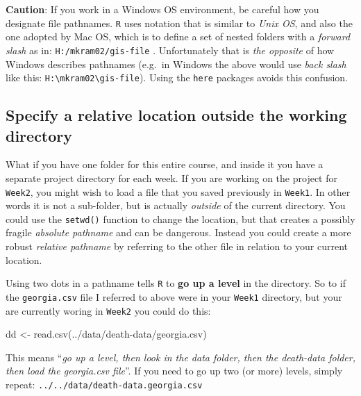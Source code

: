 \documentclass[
]{book}
\newenvironment{Shaded}{\begin{snugshade}}{\end{snugshade}}
\newcommand{\FunctionTok}[1]{\textcolor[rgb]{0.00,0.00,0.00}{#1}}
\newcommand{\NormalTok}[1]{#1}
\newcommand{\OtherTok}[1]{\textcolor[rgb]{0.56,0.35,0.01}{#1}}
\newcommand{\StringTok}[1]{\textcolor[rgb]{0.31,0.60,0.02}{#1}}
\newenvironment{rmdcaution}[1]
  {
  \begin{itemize}
  \renewcommand{\labelitemi}{
    \raisebox{-.7\height}[0pt][0pt]{
      {\setkeys{Gin}{width=3em,keepaspectratio}\texttt{[image: images/\#1]}}
    }
  }
  \setlength{\fboxsep}{1em}
  \begin{caution}
  \item
  }
  {
  \end{caution}
  \end{itemize}
  }
\begin{document}
\begin{rmdcaution}{caution}
\textbf{Caution}: If you work in a Windows OS environment, be careful how you designate file pathnames. \texttt{R} uses notation that is similar to \emph{Unix OS}, and also the one adopted by Mac OS, which is to define a set of nested folders with a \emph{forward slash} as in: \texttt{H:/mkram02/gis-file} . Unfortunately that is \emph{the opposite} of how Windows describes pathnames (e.g.~in Windows the above would use \emph{back slash} like this: \texttt{H:\textbackslash{}mkram02\textbackslash{}gis-file}). Using the \texttt{here} packages avoids this confusion.

\end{rmdcaution}

\hypertarget{specify-a-relative-location-outside-the-working-directory}{%
\subsection{Specify a relative location outside the working directory}\label{specify-a-relative-location-outside-the-working-directory}}

What if you have one folder for this entire course, and inside it you have a separate project directory for each week. If you are working on the project for \texttt{Week2}, you might wish to load a file that you saved previously in \texttt{Week1}. In other words it is not a sub-folder, but is actually \emph{outside} of the current directory. You could use the \texttt{setwd()} function to change the location, but that creates a possibly fragile \emph{absolute pathname} and can be dangerous. Instead you could create a more robust \emph{relative pathname} by referring to the other file in relation to your current location.

Using two dots in a pathname tells \texttt{R} to \textbf{go up a level} in the directory. So to if the \texttt{georgia.csv} file I referred to above were in your \texttt{Week1} directory, but your are currently woring in \texttt{Week2} you could do this:

\begin{Shaded}
\begin{Highlighting}[]
\NormalTok{dd }\OtherTok{\textless{}{-}} \FunctionTok{read.csv}\NormalTok{(}\StringTok{\textquotesingle{}../data/death{-}data/georgia.csv\textquotesingle{}}\NormalTok{)}
\end{Highlighting}
\end{Shaded}

This means ``\emph{go up a level, then look in the data folder, then the death-data folder, then load the georgia.csv file}''. If you need to go up two (or more) levels, simply repeat: \texttt{../../data/death-data.georgia.csv}
\end{document}
